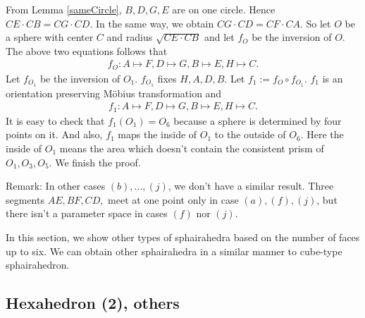 \documentclass[suppldata, dvipdfmx]{interact}
\theoremstyle{plain}%
\theoremstyle{definition}
\theoremstyle{remark}
\theoremstyle{problemstyle}
\begin{document}
From Lemma \ref{sameCircle}, $B, D, G, E$ are on one circle. Hence
$CE \cdot CB = CG \cdot CD$. In the same way, we obtain 
$CG \cdot CD = CF \cdot CA$. So let $O$ be a sphere with center $C$ and
radius $\sqrt{CE \cdot CB}$ and let $f_O$ be the inversion of $O$.
The above two equations follows that
\begin{align*}
 f_O: A \mapsto F, D \mapsto G, B \mapsto E, H \mapsto C.
\end{align*}
Let $f_{O_1}$ be the inversion of $O_1$. $f_{O_1}$ fixes $H, A, D, B$.
Let $f_1 := f_O \circ f_{O_1}$.
$f_1$ is an orientation preserving M\"obius transformation and
\begin{align*}
 f_1 : A \mapsto F, D \mapsto G, B \mapsto E, H \mapsto C.
\end{align*}
It is easy to check that $f_1(O_1) = O_6$ because a sphere is determined
by four points on it. And also, $f_1$ maps the inside of $O_1$ to the
outside of $O_6$. Here the inside of $O_1$ means the area which doesn't
contain the consistent prism of $O_1, O_3, O_5$. We finish the
proof.

Remark:
In other cases $(b),...,(j)$, we don't have a similar result. Three
segments $AE, BF, CD,$ meet at one point only in case $(a), (f), (j)$, but
there isn't a parameter space in cases $(f)$ nor $(j)$.



In this section, we show other types of sphairahedra based on the
number of faces up to six.
We can obtain other sphairahedra in a similar manner to cube-type
sphairahedron.



\subsection{Hexahedron (2), others}

\end{document}
